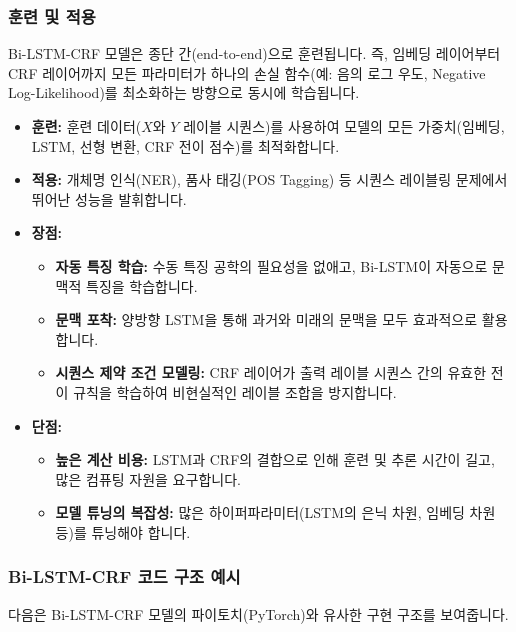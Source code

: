 \documentclass[11pt,a4paper]{article}
\theoremstyle{definition}
\begin{document}
\subsubsection{훈련 및 적용}
Bi-LSTM-CRF 모델은 종단 간(end-to-end)으로 훈련됩니다. 즉, 임베딩 레이어부터 CRF 레이어까지 모든 파라미터가 하나의 손실 함수(예: 음의 로그 우도, Negative Log-Likelihood)를 최소화하는 방향으로 동시에 학습됩니다.

\begin{itemize}
    \item \textbf{훈련:} 훈련 데이터($X$와 $Y$ 레이블 시퀀스)를 사용하여 모델의 모든 가중치(임베딩, LSTM, 선형 변환, CRF 전이 점수)를 최적화합니다.
    \item \textbf{적용:} 개체명 인식(NER), 품사 태깅(POS Tagging) 등 시퀀스 레이블링 문제에서 뛰어난 성능을 발휘합니다.
\item \textbf{장점:}
    \begin{itemize}
        \item \textbf{자동 특징 학습:} 수동 특징 공학의 필요성을 없애고, Bi-LSTM이 자동으로 문맥적 특징을 학습합니다.
        \item \textbf{문맥 포착:} 양방향 LSTM을 통해 과거와 미래의 문맥을 모두 효과적으로 활용합니다.
        \item \textbf{시퀀스 제약 조건 모델링:} CRF 레이어가 출력 레이블 시퀀스 간의 유효한 전이 규칙을 학습하여 비현실적인 레이블 조합을 방지합니다.
    \end{itemize}
    \item \textbf{단점:}
    \begin{itemize}
        \item \textbf{높은 계산 비용:} LSTM과 CRF의 결합으로 인해 훈련 및 추론 시간이 길고, 많은 컴퓨팅 자원을 요구합니다.
        \item \textbf{모델 튜닝의 복잡성:} 많은 하이퍼파라미터(LSTM의 은닉 차원, 임베딩 차원 등)를 튜닝해야 합니다.
    \end{itemize}
\end{itemize}

\subsubsection{Bi-LSTM-CRF 코드 구조 예시}
다음은 Bi-LSTM-CRF 모델의 파이토치(PyTorch)와 유사한 구현 구조를 보여줍니다.
\end{document}
